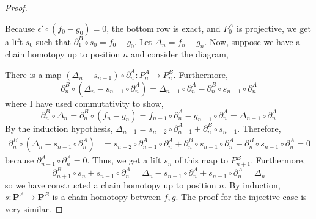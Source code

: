 \documentclass[12pt]{article}
\theoremstyle{remark}
\theoremstyle{definition}
\begin{document}
\begin{proof}
\begin{center}
\end{center}
Because $\epsilon' \circ (f_0 - g_0) = 0$, the bottom row is exact, and $P^A_0$ is projective, we get a lift $s_0$ such that $\partial_1^B \circ s_0 = f_0 - g_0$. Let $\Delta_n = f_n - g_n$. Now, suppose we have a chain homotopy up to position $n$ and consider the diagram,
\begin{center}
\end{center} 
There is a map $(\Delta_n - s_{n-1}) \circ \partial_n^A : P_n^A \to P_n^B$. 
Furthermore, 
\[ \partial_n^B \circ (\Delta_n - s_{n-1} \circ \partial_n^A) = \Delta_{n-1} \circ \partial_n^A - \partial_n^B \circ s_{n-1} \circ \partial_n^A \]
where I have used commutativity to show,
\[ \partial^B_n \circ \Delta_n = \partial^B_n \circ (f_n - g_n) = f_{n-1} \circ \partial^A_n - g_{n-1} \circ \partial^A_n = \Delta_{n-1} \circ \partial^A_n \]
By the induction hypothesis, $\Delta_{n-1} = s_{n-2} \circ \partial_{n-1}^A + \partial_{n}^B \circ s_{n-1}$. Therefore,
\begin{align*}
\partial_n^B \circ (\Delta_n - s_{n-1} \circ \partial_n^A) & = s_{n-2} \circ \partial_{n-1}^A \circ \partial_{n}^A + \partial_{n}^B \circ s_{n-1} \circ \partial_{n}^A - \partial_n^B \circ s_{n-1} \circ \partial_n^A = 0
\end{align*}
because $\partial_{n-1}^A \circ \partial_{n}^A = 0$. Thus, we get a lift $s_n$ of this map to $P_{n+1}^B$. Furthermore,
\[ \partial_{n+1}^B \circ s_n + s_{n-1} \circ \partial_n^A = \Delta_n - s_{n-1} \circ \partial_n^A + s_{n-1} \circ \partial_n^A = \Delta_n \]
so we have constructed a chain homotopy up to position $n$. By induction, $s : \mathbf{P}^A \to \mathbf{P}^B$ is a chain homotopy between $f, g$. The proof for the injective case is very similar.   
\end{proof}
\end{document}
